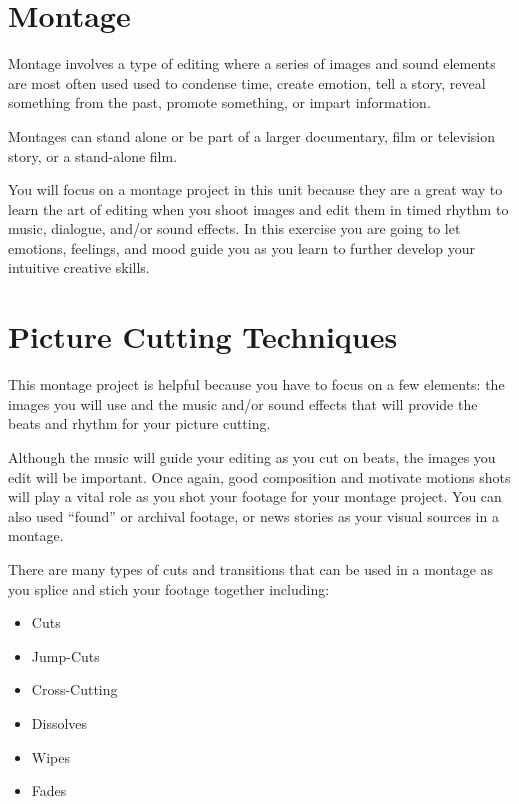 \documentclass[
]{book}
\providecommand{\tightlist}{%
  \setlength{\itemsep}{0pt}\setlength{\parskip}{0pt}}
\begin{document}
\hypertarget{montage}{%
\section{Montage}\label{montage}}

Montage involves a type of editing where a series of images and sound elements are most often used used to condense time, create emotion, tell a story, reveal something from the past, promote something, or impart information.

Montages can stand alone or be part of a larger documentary, film or television story, or a stand-alone film.

You will focus on a montage project in this unit because they are a great way to learn the art of editing when you shoot images and edit them in timed rhythm to music, dialogue, and/or sound effects. In this exercise you are going to let emotions, feelings, and mood guide you as you learn to further develop your intuitive creative skills.

\hypertarget{picture-cutting-techniques}{%
\section{Picture Cutting Techniques}\label{picture-cutting-techniques}}

This montage project is helpful because you have to focus on a few elements: the images you will use and the music and/or sound effects that will provide the beats and rhythm for your picture cutting.

Although the music will guide your editing as you cut on beats, the images you edit will be important. Once again, good composition and motivate motions shots will play a vital role as you shot your footage for your montage project. You can also used ``found'' or archival footage, or news stories as your visual sources in a montage.

There are many types of cuts and transitions that can be used in a montage as you splice and stich your footage together including:

\begin{itemize}
\tightlist
\item
  Cuts
\item
  Jump-Cuts
\item
  Cross-Cutting
\item
  Dissolves
\item
  Wipes
\item
  Fades
\end{itemize}
\end{document}
